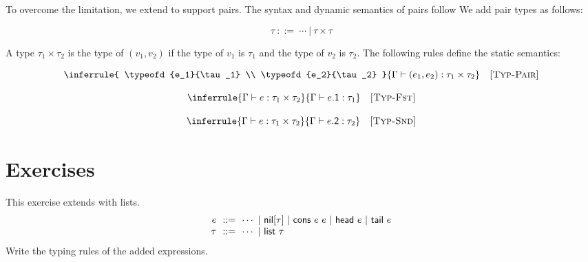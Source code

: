 To overcome the limitation, we extend \lang to support pairs.
The syntax and dynamic semantics of pairs follow
We add pair types as follows:

\[ \tau \ ::= \ \cdots\ | \ \tau\times\tau \]

A type $\tau_1\times\tau_2$ is the type of $(v_1,v_2)$ if the type of $v_1$ is
$\tau_1$ and the type of $v_2$ is $\tau_2$.
The following rules define the static semantics:


\vspace{-1em}

\[
  \inferrule
  { \typeofd{e_1}{\tau_1} \\
    \typeofd{e_2}{\tau_2} }
  { \typeofd{(e_1,e_2)}{\tau_1\times\tau_2} }
  \quad\textsc{[Typ-Pair]}
\]


\vspace{-1em}

\[
  \inferrule
  { \typeofd{e}{\tau_1\times\tau_2} }
  { \typeofd{e\textsf{.1}}{\tau_1} }
  \quad\textsc{[Typ-Fst]}
\]


\vspace{-1em}

\[
  \inferrule
  { \typeofd{e}{\tau_1\times\tau_2} }
  { \typeofd{e\textsf{.2}}{\tau_2} }
  \quad\textsc{[Typ-Snd]}
\]

\section{Exercises}

\begin{exercise}

This exercise extends \lang with lists.
  \[
    \begin{array}{r@{~~}r@{~~}l}
      e & ::= & \cdots
      \ |\ \textsf{nil}[\tau]
      \ |\ \textsf{cons}\ e\ e
      \ |\ \textsf{head}\ e
      \ |\ \textsf{tail}\ e \\
      \tau & ::= & \cdots\ |\ \textsf{list}\ \tau \\
    \end{array}
  \]
Write the typing rules of the added expressions.

\end{exercise}

